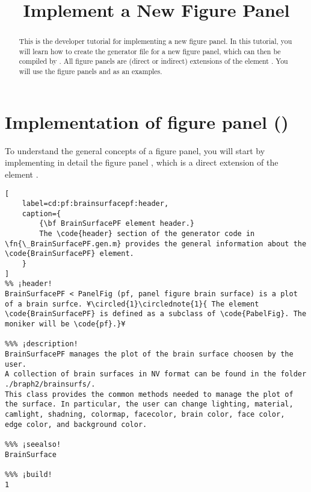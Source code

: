 \documentclass{tufte-handout}
\title{Implement a New Figure Panel}
\begin{document}
\maketitle

\begin{abstract}
\noindent
This is the developer tutorial for implementing a new figure panel. 
In this tutorial, you will learn how to create the generator file  for a new figure panel, which can then be compiled by . 
All figure panels are (direct or indirect) extensions of the element .
You will use the figure panels  and  as an examples.
\end{abstract}

\tableofcontents

\clearpage

\section{Implementation of figure panel ()}

To understand the general concepts of a figure panel, you will start by implementing in detail the figure panel , which is a direct extension of the element .

\begin{lstlisting}[
	label=cd:pf:brainsurfacepf:header,
	caption={
		{\bf BrainSurfacePF element header.}
		The \code{header} section of the generator code in \fn{\_BrainSurfacePF.gen.m} provides the general information about the \code{BrainSurfacePF} element.
	}
]
%% ¡header!
BrainSurfacePF < PanelFig (pf, panel figure brain surface) is a plot of a brain surfce. ¥\circled{1}\circlednote{1}{ The element \code{BrainSurfacePF} is defined as a subclass of \code{PabelFig}. The moniker will be \code{pf}.}¥

%%% ¡description!
BrainSurfacePF manages the plot of the brain surface choosen by the user. 
A collection of brain surfaces in NV format can be found in the folder 
./braph2/brainsurfs/.
This class provides the common methods needed to manage the plot of 
the surface. In particular, the user can change lighting, material, 
camlight, shadning, colormap, facecolor, brain color, face color, 
edge color, and background color. 

%%% ¡seealso!
BrainSurface

%%% ¡build!
1
\end{lstlisting}
\end{document}
